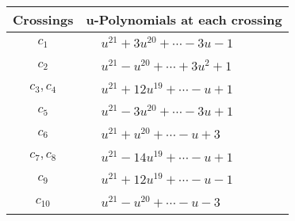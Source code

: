 \documentclass[1p]{elsarticle_modified}
\theoremstyle{definition}
\begin{document}
\begin{tabular}{m{50pt}|m{274pt}}
Crossings & \hspace{64pt}u-Polynomials at each crossing \\
\hline $$\begin{aligned}c_{1}\end{aligned}$$&$\begin{aligned}
&u^{21}+3 u^{20}+\cdots-3 u-1
\end{aligned}$\\
\hline $$\begin{aligned}c_{2}\end{aligned}$$&$\begin{aligned}
&u^{21}- u^{20}+\cdots+3 u^2+1
\end{aligned}$\\
\hline $$\begin{aligned}c_{3},c_{4}\end{aligned}$$&$\begin{aligned}
&u^{21}+12 u^{19}+\cdots- u+1
\end{aligned}$\\
\hline $$\begin{aligned}c_{5}\end{aligned}$$&$\begin{aligned}
&u^{21}-3 u^{20}+\cdots-3 u+1
\end{aligned}$\\
\hline $$\begin{aligned}c_{6}\end{aligned}$$&$\begin{aligned}
&u^{21}+u^{20}+\cdots- u+3
\end{aligned}$\\
\hline $$\begin{aligned}c_{7},c_{8}\end{aligned}$$&$\begin{aligned}
&u^{21}-14 u^{19}+\cdots- u+1
\end{aligned}$\\
\hline $$\begin{aligned}c_{9}\end{aligned}$$&$\begin{aligned}
&u^{21}+12 u^{19}+\cdots- u-1
\end{aligned}$\\
\hline $$\begin{aligned}c_{10}\end{aligned}$$&$\begin{aligned}
&u^{21}- u^{20}+\cdots- u-3
\end{aligned}$\\

\end{tabular}
\end{document}
